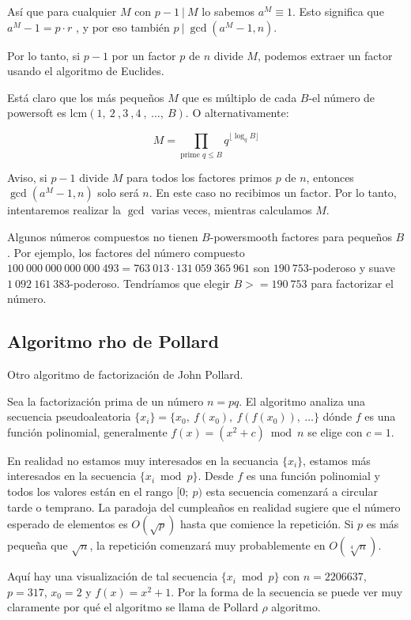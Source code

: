 Así que para cualquier $M$ con $p - 1 ~|~ M$ lo sabemos $a^M \equiv 1$. Esto significa que $a^M - 1 = p \cdot r$ , y por eso también $p ~|~ \gcd(a^M - 1, n)$.

Por lo tanto, si $p-1$ por un factor $p$ de $n$ divide $M$, podemos extraer un factor usando el algoritmo de Euclides.

Está claro que los más pequeños $M$ que es múltiplo de cada $B$-el número de powersoft es $\text{lcm}(1,~2~,3~,4~,~\dots,~B)$. O alternativamente:

$$M = \prod_{\text{prime } q \le B} q^{\lfloor \log_q B \rfloor}$$

Aviso, si $p-1$ divide $M$ para todos los factores primos $p$ de $n$, entonces $\gcd(a^M - 1, n)$ solo será $n$. En este caso no recibimos un factor. Por lo 
tanto, intentaremos realizar la $\gcd$ varias veces, mientras calculamos $M$.

Algunos números compuestos no tienen $B$-powersmooth factores para pequeños $B$. Por ejemplo, los factores del número compuesto $100~000~000~000~000~493 = 763~013 \cdot 131~059~365~961$ son $190~753$-poderoso y suave $1~092~161~383$-poderoso. Tendríamos que elegir $B >= 190~753$ para factorizar el número.

\subsection{Algoritmo rho de Pollard}
Otro algoritmo de factorización de John Pollard.

Sea la factorización prima de un número $n = pq$. El algoritmo analiza una secuencia pseudoaleatoria 
$\{x_i\} = \{x_0,~f(x_0),~f(f(x_0)),~\dots\}$ dónde $f$ es una función polinomial, generalmente
$f(x) = (x^2 + c) \bmod n$ se elige con $c = 1$.

En realidad no estamos muy interesados en la secuancia  $\{x_i\}$, estamos más interesados en la
secuencia $\{x_i \bmod p\}$. Desde $f$ es una función polinomial y todos los valores están en el 
rango $[0;~p)$ esta secuencia comenzará a circular tarde o temprano. La paradoja del cumpleaños en 
realidad sugiere que el número esperado de elementos es $O(\sqrt{p})$ hasta que comience la 
repetición. Si $p$ es más pequeña que $\sqrt{n}$, la repetición comenzará muy probablemente en 
$O(\sqrt[4]{n})$.

Aquí hay una visualización de tal secuencia $\{x_i \bmod p\}$ con $n = 2206637$, $p = 317$, $x_0 = 2$ y $f(x) = x^2 + 1$. Por la forma de la secuencia se puede ver muy claramente por qué el algoritmo se llama de Pollard $\rho$ algoritmo.

